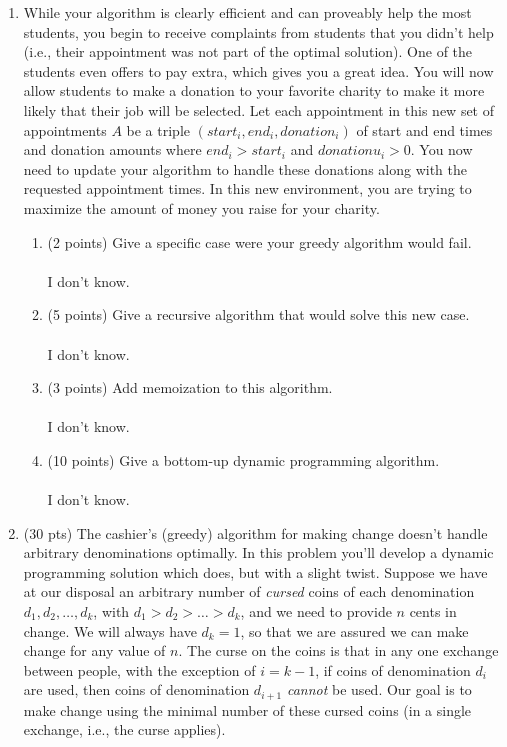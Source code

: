 \documentclass[12pt]{article}
\begin{document}
\begin{enumerate}
\item %
While your algorithm is clearly efficient and can proveably help the most
students, you begin to receive complaints from students that you didn’t
help (i.e., their appointment was not part of the optimal solution).
One of the students even offers to pay extra, which gives you a great
idea. You will now allow students to make a donation to your favorite
charity to make it more likely that their job will be selected. Let
each appointment in this new set of appointments $A$ be a triple 
 $(start_i, end_i, donation_i)$ of start and end times and donation amounts
where $end_i>start_i$ and $donationu_i>0$. You now need to update your
algorithm to handle these donations along with the requested appointment times.
In this new environment, you are trying to maximize the amount of money
you raise for your charity.
\pagebreak

\begin{enumerate}
    \item \label{2a} (2 points) Give a specific case were your greedy algorithm would fail.
\\ \\ I don't know.
\pagebreak
    \item \label{2b} (5 points) Give a recursive algorithm that would solve this new case.
\\ \\ I don't know.
\pagebreak
    \item \label{2c} (3 points) Add memoization to this algorithm.
\\ \\ I don't know.
\pagebreak
    \item \label{2d} (10 points) Give a bottom-up dynamic programming algorithm.
\\ \\ I don't know.
\pagebreak
\end{enumerate}

\item (30 pts) 
The cashier's (greedy) algorithm for making change doesn't handle arbitrary
denominations optimally. In this problem you'll develop a dynamic
programming solution which does, but with a slight twist. Suppose we
have at our disposal an arbitrary number of \emph{cursed} coins of each
denomination $d_1, d_2, \dotsc, d_k$, with $d_1 > d_2 > \dotsc > d_k$,
and we need to provide $n$ cents in change. We will always have
$d_k=1$, so that we are assured we can make change for any value of
$n$. The curse on the coins is that in any one exchange between people,
with the exception of $i=k-1$, if coins of denomination $d_i$ are used,
then coins of denomination $d_{i+1}$ \emph{cannot} be used. Our goal is
to make change using the minimal number of these cursed coins (in a
single exchange, i.e., the curse applies).
\pagebreak
	

\end{enumerate}
\end{document}
